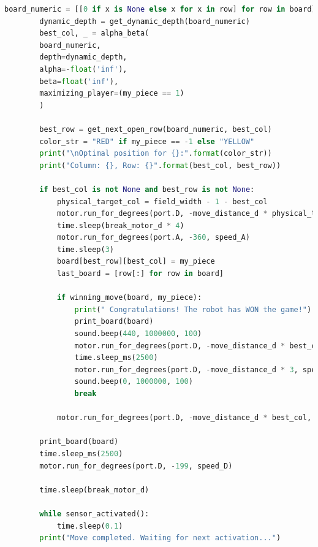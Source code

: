 \begin{lstlisting}[language=Python]
		board_numeric = [[0 if x is None else x for x in row] for row in board]
		dynamic_depth = get_dynamic_depth(board_numeric)
		best_col, _ = alpha_beta(
		board_numeric,
		depth=dynamic_depth,
		alpha=-float('inf'),
		beta=float('inf'),
		maximizing_player=(my_piece == 1)
		)
		
		best_row = get_next_open_row(board_numeric, best_col)
		color_str = "RED" if my_piece == -1 else "YELLOW"
		print("\nOptimal position for {}:".format(color_str))
		print("Column: {}, Row: {}".format(best_col, best_row))
		
		if best_col is not None and best_row is not None:
			physical_target_col = field_width - 1 - best_col
			motor.run_for_degrees(port.D, -move_distance_d * physical_target_col, speed_D)
			time.sleep(break_motor_d * 4)
			motor.run_for_degrees(port.A, -360, speed_A)
			time.sleep(3)
			board[best_row][best_col] = my_piece
			last_board = [row[:] for row in board]
			
			if winning_move(board, my_piece):
				print(" Congratulations! The robot has WON the game!")
				print_board(board)
				sound.beep(440, 1000000, 100)
				motor.run_for_degrees(port.D, -move_distance_d * best_col, speed_D)
				time.sleep_ms(2500)
				motor.run_for_degrees(port.D, -move_distance_d * 3, speed_D)
				sound.beep(0, 1000000, 100)
				break
		
			motor.run_for_degrees(port.D, -move_distance_d * best_col, speed_D)
		
		print_board(board)
		time.sleep_ms(2500)
		motor.run_for_degrees(port.D, -199, speed_D)
		
		time.sleep(break_motor_d)
		
		while sensor_activated():
			time.sleep(0.1)
		print("Move completed. Waiting for next activation...")
	
	
\end{lstlisting}

